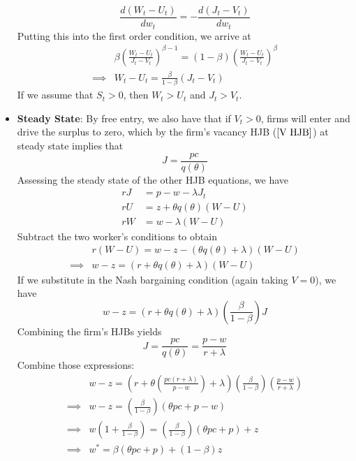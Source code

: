 \documentclass[12pt]{article}
\begin{document}
\begin{itemize}
    \[\frac{d(W_t-U_t)}{dw_t} = -\frac{d(J_t - V_t)}{dw_t}\]
    Putting this into the first order condition, we arrive at
    \[\begin{split}
        &\beta \left(\frac{W_t-U_t}{J_t-V_t}\right)^{\beta - 1} = (1-\beta)\left(\frac{W_t-U_t}{J_t-V_t}\right)^{\beta} \\
        \implies &W_t - U_t = \frac{\beta}{1-\beta}(J_t - V_t)
    \end{split}\]
    If we assume that $S_t > 0$, then $W_t > U_t$ and $J_t > V_t$. 
    \item \textbf{Steady State}: By free entry, we also have that if $V_t > 0$, firms will enter and drive the surplus to zero, which by the firm's vacancy HJB ($\ref{V HJB}$) at steady state implies that
    \[J = \frac{pc}{q(\theta)}\]
    Assessing the steady state of the other HJB equations, we have
    \[\begin{split}
        rJ &= p - w - \lambda J_t\\
        rU &= z + \theta q(\theta)(W - U) \\
        rW &= w - \lambda(W - U)
    \end{split}\]
    Subtract the two worker's conditions to obtain
    \[\begin{split}
        &r(W-U) = w - z - (\theta q(\theta) + \lambda)(W-U) \\
        \implies &w-z = (r + \theta q(\theta) + \lambda)(W-U)
    \end{split}\]
    If we substitute in the Nash bargaining condition (again taking $V=0$), we have
    \[w-z = (r + \theta q(\theta) + \lambda)\left(\frac{\beta}{1-\beta}\right)J\]
    Combining the firm's HJBs yields
    \[J = \frac{pc}{q(\theta)} = \frac{p-w}{r + \lambda}\]
    Combine those expressions:
    \begin{equation}\label{Job Search Optimal Wage}
        \begin{split}
        &w-z = \left(r + \theta \left(\frac{pc(r+\lambda)}{p-w}\right) + \lambda\right)\left(\frac{\beta}{1-\beta}\right)\left(\frac{p-w}{r + \lambda}\right) \\
        \implies &w-z = \left(\frac{\beta}{1-\beta}\right)(\theta pc + p - w) \\
        \implies &w \left(1+\frac{\beta}{1-\beta}\right) = \left(\frac{\beta}{1-\beta}\right)(\theta pc + p) + z \\
        \implies &w^* = \beta (\theta pc + p) + (1-\beta)z
    \end{split}
    \end{equation}

\end{itemize}
\end{document}
